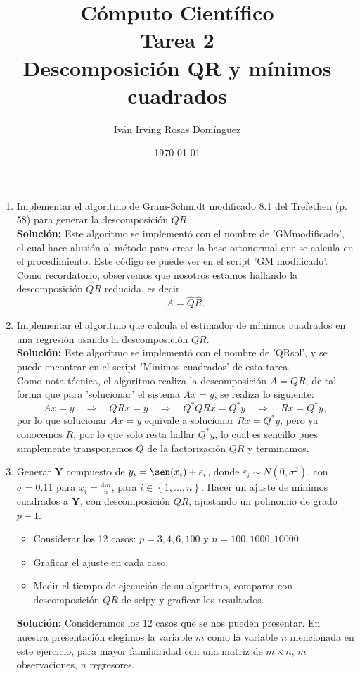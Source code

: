 \documentclass[letterpaper]{article}
\title{\textbf{Cómputo Científico\\Tarea 2\\Descomposición QR y mínimos cuadrados}}
\author{Iván Irving Rosas Domínguez}
\date{\today}
\newcommand{\ent}{\Longrightarrow}
\newcommand{\1}{\mathds{1}}
\theoremstyle{definition}
\theoremstyle{definition}
\theoremstyle{definition}
\theoremstyle{definition}
\theoremstyle{definition}
\begin{document}
\maketitle


\begin{enumerate}
    \item Implementar el algoritmo de Gram-Schmidt modificado 8.1 del Trefethen (p. 58)
    para generar la descomposición $QR$.\\

    \textbf{Solución:} Este algoritmo se implementó con el nombre de 'GMmodificado', el cual hace alusión
    al método para crear la base ortonormal que se calcula en el procedimiento. Este código se puede ver 
    en el script 'GM modificado'. Como recordatorio, observemos que nosotros estamos hallando la descomposición
    $QR$ reducida, es decir
    \[
    A=\hat{Q}\hat{R}.
    \]
    
    \item Implementar el algoritmo que calcula el estimador de mínimos cuadrados
    en una regresión usando la descomposición $QR$.\\

    \textbf{Solución:} Este algoritmo se implementó con el nombre de 'QRsol', y se puede encontrar en 
    el script 'Minimos cuadrados' de esta tarea.\\

    Como nota técnica, el algoritmo realiza la descomposición $A=QR$, de tal forma que para 'solucionar' el
    sistema $Ax=y$, se realiza lo siguiente:
    \[
    Ax=y \quad \ent \quad QRx=y \quad \ent \quad Q^*QRx=Q^*y \quad \ent \quad Rx=Q^*y,
    \]
    por lo que solucionar $Ax=y$ equivale a solucionar $Rx=Q^*y$, pero ya conocemos $R$, por lo que
    solo resta hallar $Q^*y$, lo cual es sencillo pues simplemente transponemos $Q$ de la factorización
    $QR$ y terminamos.

    \item Generar $\textbf{Y}$ compuesto de $y_i=\sen(x_i)+\varepsilon_i$, donde 
    $\varepsilon_i\sim N(0,\sigma^2)$, con $\sigma=0.11$ para $x_i=\frac{4\pi i}{n}$,
    para $i\in \left\{1,...,n\right\}$.
    Hacer un ajuste de mínimos cuadrados a $\textbf{Y}$, con descomposición $QR$,
    ajustando un polinomio de grado $p-1$.
    \begin{itemize}
        \item Considerar los 12 casos: $p=3,4,6,100$ y $n=100,1000,10000$.
        \item Graficar el ajuste en cada caso.
        \item Medir el tiempo de ejecución de su algoritmo, comparar con 
        descomposición $QR$ de scipy y graficar los resultados.
    \end{itemize}
    \textbf{Solución:} Consideramos los 12 casos que se nos pueden presentar. En nuestra presentación elegimos la variable $m$ como la variable
    $n$ mencionada en este ejercicio, para mayor familiaridad con una matriz de $m\times n$, $m$ observaciones, $n$ regresores.\\


\end{enumerate}
\end{document}
